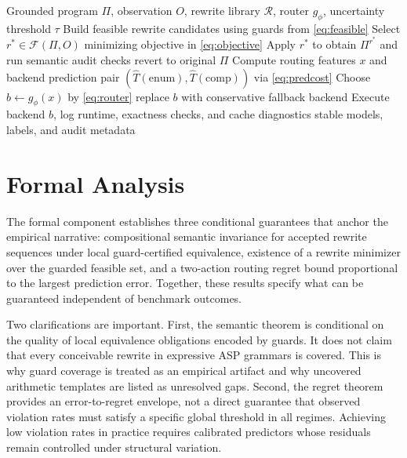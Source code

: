 \documentclass{article} %
\begin{document}
\begin{algorithm}[t]
\caption{AutoTW-ASP Inference-Time Optimization}
\label{alg:autotw}
\begin{algorithmic}[1]
\REQUIRE Grounded program $\Pi$, observation $O$, rewrite library $\mathcal{R}$, router $g_{\phi}$, uncertainty threshold $\tau$
\STATE Build feasible rewrite candidates using guards from \eqref{eq:feasible}
\STATE Select $r^*\in\mathcal{F}(\Pi,O)$ minimizing objective in \eqref{eq:objective}
\STATE Apply $r^*$ to obtain $\Pi^{r^*}$ and run semantic audit checks
    \STATE revert to original $\Pi$
\ENDIF
\STATE Compute routing features $x$ and backend prediction pair $(\widehat{T}(\text{enum}),\widehat{T}(\text{comp}))$ via \eqref{eq:predcost}
\STATE Choose $b\leftarrow g_{\phi}(x)$ by \eqref{eq:router}
    \STATE replace $b$ with conservative fallback backend
\ENDIF
\STATE Execute backend $b$, log runtime, exactness checks, and cache diagnostics
\RETURN stable models, labels, and audit metadata
\end{algorithmic}
\end{algorithm}

\section{Formal Analysis}
\label{sec:formal}
The formal component establishes three conditional guarantees that anchor the empirical narrative: compositional semantic invariance for accepted rewrite sequences under local guard-certified equivalence, existence of a rewrite minimizer over the guarded feasible set, and a two-action routing regret bound proportional to the largest prediction error. Together, these results specify what can be guaranteed independent of benchmark outcomes.

Two clarifications are important. First, the semantic theorem is conditional on the quality of local equivalence obligations encoded by guards. It does not claim that every conceivable rewrite in expressive ASP grammars is covered. This is why guard coverage is treated as an empirical artifact and why uncovered arithmetic templates are listed as unresolved gaps. Second, the regret theorem provides an error-to-regret envelope, not a direct guarantee that observed violation rates must satisfy a specific global threshold in all regimes. Achieving low violation rates in practice requires calibrated predictors whose residuals remain controlled under structural variation.
\end{document}
